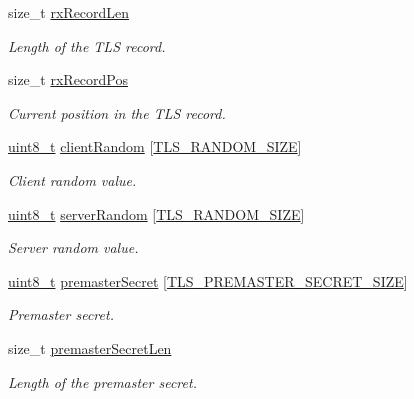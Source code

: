 \begin{DoxyCompactItemize}
size\+\_\+t \hyperlink{struct__TlsContext_ada661bb5585cab437b391743b7391c9c}{rx\+Record\+Len}
\begin{DoxyCompactList}\small\item\em Length of the T\+LS record. \end{DoxyCompactList}\item 
size\+\_\+t \hyperlink{struct__TlsContext_a659acbce0996a343401d976c75975612}{rx\+Record\+Pos}
\begin{DoxyCompactList}\small\item\em Current position in the T\+LS record. \end{DoxyCompactList}\item 
\hyperlink{stdint_8h_aba7bc1797add20fe3efdf37ced1182c5}{uint8\+\_\+t} \hyperlink{struct__TlsContext_a2dca63a7256341ebc9583c8b94a17caf}{client\+Random} \mbox{[}\hyperlink{tls_8h_aafeca350828039567f4495388ca1fa52}{T\+L\+S\+\_\+\+R\+A\+N\+D\+O\+M\+\_\+\+S\+I\+ZE}\mbox{]}
\begin{DoxyCompactList}\small\item\em Client random value. \end{DoxyCompactList}\item 
\hyperlink{stdint_8h_aba7bc1797add20fe3efdf37ced1182c5}{uint8\+\_\+t} \hyperlink{struct__TlsContext_a0f151ab40e38abded1d4fb0baf9149b7}{server\+Random} \mbox{[}\hyperlink{tls_8h_aafeca350828039567f4495388ca1fa52}{T\+L\+S\+\_\+\+R\+A\+N\+D\+O\+M\+\_\+\+S\+I\+ZE}\mbox{]}
\begin{DoxyCompactList}\small\item\em Server random value. \end{DoxyCompactList}\item 
\hyperlink{stdint_8h_aba7bc1797add20fe3efdf37ced1182c5}{uint8\+\_\+t} \hyperlink{struct__TlsContext_af4cf43203ab85e0ecf88475fade1ac80}{premaster\+Secret} \mbox{[}\hyperlink{tls_8h_ab57dd89b36996f086e46d778395375c3}{T\+L\+S\+\_\+\+P\+R\+E\+M\+A\+S\+T\+E\+R\+\_\+\+S\+E\+C\+R\+E\+T\+\_\+\+S\+I\+ZE}\mbox{]}
\begin{DoxyCompactList}\small\item\em Premaster secret. \end{DoxyCompactList}\item 
size\+\_\+t \hyperlink{struct__TlsContext_ae3cc4854b99087709a6247879e5cdf6c}{premaster\+Secret\+Len}
\begin{DoxyCompactList}\small\item\em Length of the premaster secret. \end{DoxyCompactList}\item 

\end{DoxyCompactItemize}
